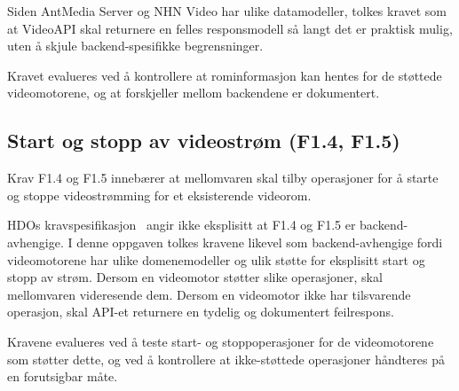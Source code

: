 Siden AntMedia Server og NHN Video har ulike datamodeller, tolkes 
kravet som at VideoAPI skal returnere en felles responsmodell så langt 
det er praktisk mulig, uten å skjule backend-spesifikke begrensninger.

Kravet evalueres ved å kontrollere at rominformasjon kan hentes for 
de støttede videomotorene, og at forskjeller mellom backendene er 
dokumentert.

\subsection{Start og stopp av videostrøm (F1.4, F1.5)}
\label{subsec:krav-f14-f15}

Krav F1.4 og F1.5 innebærer at mellomvaren skal tilby operasjoner for 
å starte og stoppe videostrømming for et eksisterende videorom.

HDOs kravspesifikasjon~\cite{hdo_kravspec} angir ikke eksplisitt at 
F1.4 og F1.5 er backend-avhengige. I denne oppgaven tolkes kravene 
likevel som backend-avhengige fordi videomotorene har ulike 
domenemodeller og ulik støtte for eksplisitt start og stopp av strøm. 
Dersom en videomotor støtter slike operasjoner, skal mellomvaren 
videresende dem. Dersom en videomotor ikke har tilsvarende operasjon, 
skal API-et returnere en tydelig og dokumentert feilrespons.

Kravene evalueres ved å teste start- og stoppoperasjoner for de 
videomotorene som støtter dette, og ved å kontrollere at ikke-støttede 
operasjoner håndteres på en forutsigbar måte.